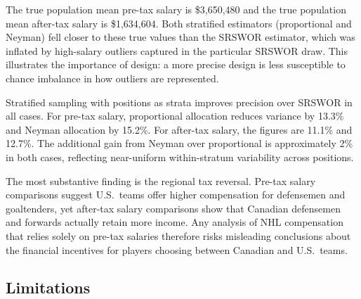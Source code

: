\documentclass[12pt]{article}
\begin{document}
The true population mean pre-tax salary is \$3{,}650{,}480 and the true population
mean after-tax salary is \$1{,}634{,}604.
Both stratified estimators (proportional and Neyman) fell closer to these true values
than the SRSWOR estimator, which was inflated by high-salary outliers captured in the
particular SRSWOR draw.
This illustrates the importance of design: a more precise design is less susceptible
to chance imbalance in how outliers are represented.

Stratified sampling with positions as strata improves precision over SRSWOR in all
cases.
For pre-tax salary, proportional allocation reduces variance by 13.3\% and Neyman
allocation by 15.2\%. For after-tax salary, the figures are 11.1\% and 12.7\%.
The additional gain from Neyman over proportional is approximately 2\% in both cases,
reflecting near-uniform within-stratum variability across positions.

The most substantive finding is the regional tax reversal.
Pre-tax salary comparisons suggest U.S.\ teams offer higher compensation for
defensemen and goaltenders, yet after-tax salary comparisons show that Canadian
defensemen and forwards actually retain more income.
Any analysis of NHL compensation that relies solely on pre-tax salaries therefore
risks misleading conclusions about the financial incentives for players choosing
between Canadian and U.S.\ teams.

\subsection{Limitations}
\end{document}
